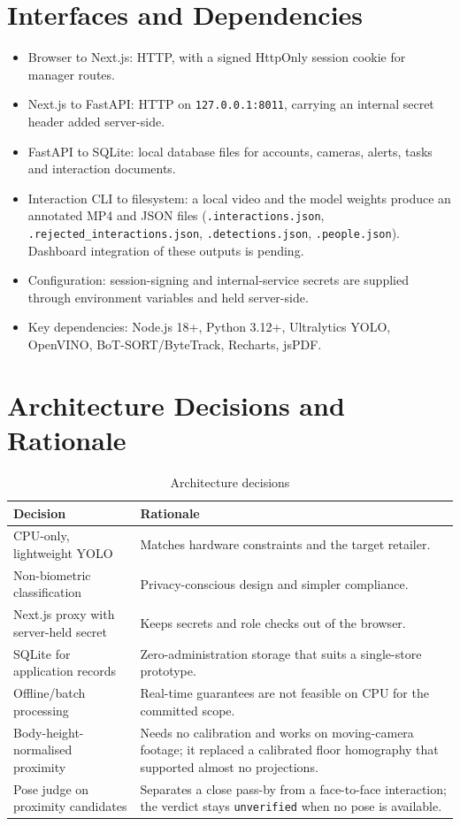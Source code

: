 \section{Interfaces and Dependencies}
\begin{itemize}
\item Browser to Next.js: HTTP, with a signed HttpOnly session cookie for manager routes.
\item Next.js to FastAPI: HTTP on \texttt{127.0.0.1:8011}, carrying an internal secret header added server-side.
\item FastAPI to SQLite: local database files for accounts, cameras, alerts, tasks and interaction documents.
\item Interaction CLI to filesystem: a local video and the model weights produce an annotated MP4 and JSON files (\texttt{.interactions.json}, \texttt{.rejected\_interactions.json}, \texttt{.detections.json}, \texttt{.people.json}). Dashboard integration of these outputs is pending.
\item Configuration: session-signing and internal-service secrets are supplied through environment variables and held server-side.
\item Key dependencies: Node.js 18+, Python 3.12+, Ultralytics YOLO, OpenVINO, BoT-SORT/ByteTrack, Recharts, jsPDF.
\end{itemize}

\section{Architecture Decisions and Rationale}
\begin{table}[H]
\centering
\caption{Architecture decisions}
\begin{tabular}{P{0.3\textwidth}P{0.58\textwidth}}
\toprule
Decision & Rationale\\
\midrule
CPU-only, lightweight YOLO & Matches hardware constraints and the target retailer.\\
Non-biometric classification & Privacy-conscious design and simpler compliance.\\
Next.js proxy with server-held secret & Keeps secrets and role checks out of the browser.\\
SQLite for application records & Zero-administration storage that suits a single-store prototype.\\
Offline/batch processing & Real-time guarantees are not feasible on CPU for the committed scope.\\
Body-height-normalised proximity & Needs no calibration and works on moving-camera footage; it replaced a calibrated floor homography that supported almost no projections.\\
Pose judge on proximity candidates & Separates a close pass-by from a face-to-face interaction; the verdict stays \texttt{unverified} when no pose is available.\\
\bottomrule
\end{tabular}
\end{table}

